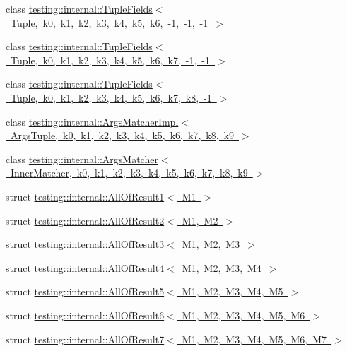 \begin{DoxyCompactItemize}
\item 
class \mbox{\hyperlink{classtesting_1_1internal_1_1_tuple_fields_3_01_tuple_00_01k0_00_01k1_00_01k2_00_01k3_00_01k4_00_15a5f7560bc4eac1ca3e5cac752bf68d}{testing\+::internal\+::\+Tuple\+Fields$<$ Tuple, k0, k1, k2, k3, k4, k5, k6, -\/1, -\/1, -\/1 $>$}}
\item 
class \mbox{\hyperlink{classtesting_1_1internal_1_1_tuple_fields_3_01_tuple_00_01k0_00_01k1_00_01k2_00_01k3_00_01k4_00_cda35487ca7d3bd5a9557919642ae14b}{testing\+::internal\+::\+Tuple\+Fields$<$ Tuple, k0, k1, k2, k3, k4, k5, k6, k7, -\/1, -\/1 $>$}}
\item 
class \mbox{\hyperlink{classtesting_1_1internal_1_1_tuple_fields_3_01_tuple_00_01k0_00_01k1_00_01k2_00_01k3_00_01k4_00_9c7cea784cec512ef84e111fc1d12260}{testing\+::internal\+::\+Tuple\+Fields$<$ Tuple, k0, k1, k2, k3, k4, k5, k6, k7, k8, -\/1 $>$}}
\item 
class \mbox{\hyperlink{classtesting_1_1internal_1_1_args_matcher_impl}{testing\+::internal\+::\+Args\+Matcher\+Impl$<$ Args\+Tuple, k0, k1, k2, k3, k4, k5, k6, k7, k8, k9 $>$}}
\item 
class \mbox{\hyperlink{classtesting_1_1internal_1_1_args_matcher}{testing\+::internal\+::\+Args\+Matcher$<$ Inner\+Matcher, k0, k1, k2, k3, k4, k5, k6, k7, k8, k9 $>$}}
\item 
struct \mbox{\hyperlink{structtesting_1_1internal_1_1_all_of_result1}{testing\+::internal\+::\+All\+Of\+Result1$<$ M1 $>$}}
\item 
struct \mbox{\hyperlink{structtesting_1_1internal_1_1_all_of_result2}{testing\+::internal\+::\+All\+Of\+Result2$<$ M1, M2 $>$}}
\item 
struct \mbox{\hyperlink{structtesting_1_1internal_1_1_all_of_result3}{testing\+::internal\+::\+All\+Of\+Result3$<$ M1, M2, M3 $>$}}
\item 
struct \mbox{\hyperlink{structtesting_1_1internal_1_1_all_of_result4}{testing\+::internal\+::\+All\+Of\+Result4$<$ M1, M2, M3, M4 $>$}}
\item 
struct \mbox{\hyperlink{structtesting_1_1internal_1_1_all_of_result5}{testing\+::internal\+::\+All\+Of\+Result5$<$ M1, M2, M3, M4, M5 $>$}}
\item 
struct \mbox{\hyperlink{structtesting_1_1internal_1_1_all_of_result6}{testing\+::internal\+::\+All\+Of\+Result6$<$ M1, M2, M3, M4, M5, M6 $>$}}
\item 
struct \mbox{\hyperlink{structtesting_1_1internal_1_1_all_of_result7}{testing\+::internal\+::\+All\+Of\+Result7$<$ M1, M2, M3, M4, M5, M6, M7 $>$}}

\end{DoxyCompactItemize}
